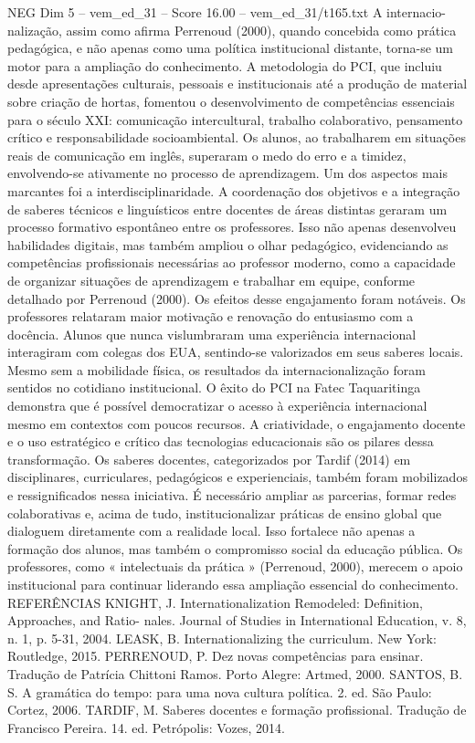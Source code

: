 \begin{textsample}{NEG Dim 5 – vem\_ed\_31 – Score 16.00 – vem\_ed\_31/t165.txt}
A internacio- nalização, assim como afirma Perrenoud (2000), quando concebida como prática pedagógica, e não apenas como uma política institucional distante, torna-se um motor para a ampliação do conhecimento.
A metodologia do PCI, que incluiu desde apresentações culturais, pessoais e institucionais até a produção de material sobre criação de hortas, fomentou o desenvolvimento de competências essenciais para o século XXI: comunicação intercultural, trabalho colaborativo, pensamento crítico e responsabilidade socioambiental.
Os alunos, ao trabalharem em situações reais de comunicação em inglês, superaram o medo do erro e a timidez, envolvendo-se ativamente no processo de aprendizagem.
Um dos aspectos mais marcantes foi a interdisciplinaridade.
A coordenação dos objetivos e a integração de saberes técnicos e linguísticos entre docentes de áreas distintas geraram um processo formativo espontâneo entre os professores.
Isso não apenas desenvolveu habilidades digitais, mas também ampliou o olhar pedagógico, evidenciando as competências profissionais necessárias ao professor moderno, como a capacidade de organizar situações de aprendizagem e trabalhar em equipe, conforme detalhado por Perrenoud (2000).
Os efeitos desse engajamento foram notáveis.
Os professores relataram maior motivação e renovação do entusiasmo com a docência.
Alunos que nunca vislumbraram uma experiência internacional interagiram com colegas dos EUA, sentindo-se valorizados em seus saberes locais.
Mesmo sem a mobilidade física, os resultados da internacionalização foram sentidos no cotidiano institucional.
O êxito do PCI na Fatec Taquaritinga demonstra que é possível democratizar o acesso à experiência internacional mesmo em contextos com poucos recursos.
A criatividade, o engajamento docente e o uso estratégico e crítico das tecnologias educacionais são os pilares dessa transformação.
Os saberes docentes, categorizados por Tardif (2014) em disciplinares, curriculares, pedagógicos e experienciais, também foram mobilizados e ressignificados nessa iniciativa.
É necessário ampliar as parcerias, formar redes colaborativas e, acima de tudo, institucionalizar práticas de ensino global que dialoguem diretamente com a realidade local.
Isso fortalece não apenas a formação dos alunos, mas também o compromisso social da educação pública.
Os professores, como « intelectuais da prática » (Perrenoud, 2000), merecem o apoio institucional para continuar liderando essa ampliação essencial do conhecimento.
REFERÊNCIAS KNIGHT, J.
Internationalization Remodeled: Definition, Approaches, and Ratio- nales.
Journal of Studies in International Education, v. 8, n. 1, p. 5-31, 2004.
LEASK, B.
Internationalizing the curriculum.
New York: Routledge, 2015.
PERRENOUD, P.
Dez novas competências para ensinar.
Tradução de Patrícia Chittoni Ramos.
Porto Alegre: Artmed, 2000.
SANTOS, B.
S.
A gramática do tempo: para uma nova cultura política. 2. ed.
São Paulo: Cortez, 2006.
TARDIF, M.
Saberes docentes e formação profissional.
Tradução de Francisco Pereira. 14. ed.
Petrópolis: Vozes, 2014.

\end{textsample}
